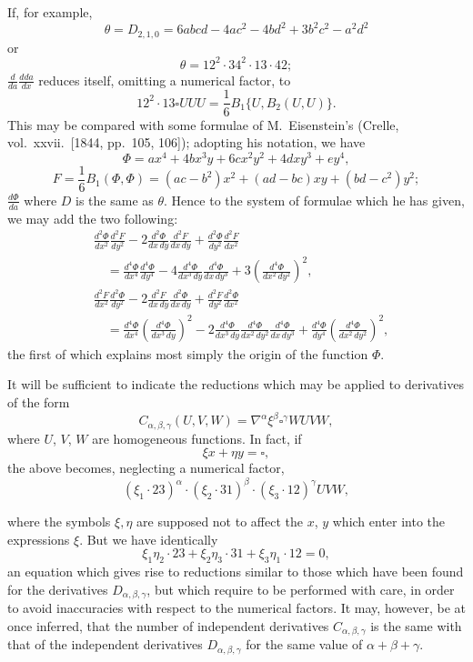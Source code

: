 \documentclass[12pt,a4paper]{article}
\begin{document}
\newpage
\setcounter{page}{111}

If, for example,
\[
\theta = D_{2,1,0} = 6abcd - 4ac^2 - 4bd^2 + 3b^2c^2 - a^2d^2
\]
or
\[
\theta = 12^2 \cdot 34^2 \cdot 13 \cdot 42;
\]
$\frac{d}{da} \frac{dda}{dx}$ reduces itself, omitting a numerical factor, to
\[
12^2 \cdot 13 \square UUU = \frac{1}{6} B_1\{U, B_2(U, U)\}.
\]
This may be compared with some formulae of M.~Eisenstein's (Crelle, vol.~xxvii.\ [1844, pp.~105, 106]); adopting his notation, we have
\[
\Phi = ax^4 + 4bx^3y + 6cx^2y^2 + 4dxy^3 + ey^4,
\]
\[
F = \frac{1}{6} B_1(\Phi, \Phi) = (ac-b^2)x^2 + (ad-bc)xy + (bd-c^2)y^2;
\]
$\frac{d\Phi}{da}$ where $D$ is the same as $\theta$. Hence to the system of formulae which he has given,
we may add the two following:
\begin{align*}
&\frac{d^2\Phi}{dx^2} \frac{d^2F}{dy^2} - 2 \frac{d^2\Phi}{dx\,dy} \frac{d^2F}{dx\,dy} + \frac{d^2\Phi}{dy^2} \frac{d^2F}{dx^2}\\
&\quad = \frac{d^4\Phi}{dx^4} \frac{d^4\Phi}{dy^4} - 4 \frac{d^4\Phi}{dx^3\,dy} \frac{d^4\Phi}{dx\,dy^3}
+ 3 \left(\frac{d^4\Phi}{dx^2\,dy^2}\right)^2,\\
&\frac{d^2F}{dx^2} \frac{d^2\Phi}{dy^2} - 2 \frac{d^2F}{dx\,dy} \frac{d^2\Phi}{dx\,dy} + \frac{d^2F}{dy^2} \frac{d^2\Phi}{dx^2}\\
&\quad = \frac{d^4\Phi}{dx^4} \left(\frac{d^4\Phi}{dx^3\,dy}\right)^2
- 2 \frac{d^4\Phi}{dx^3\,dy} \frac{d^4\Phi}{dx^2\,dy^2} \frac{d^4\Phi}{dx\,dy^3}
+ \frac{d^4\Phi}{dy^4} \left(\frac{d^4\Phi}{dx^2\,dy^2}\right)^2,
\end{align*}
the first of which explains most simply the origin of the function $\Phi$.

It will be sufficient to indicate the reductions which may be applied to derivatives
of the form
\[
C_{\alpha,\beta,\gamma}(U, V, W) = \nabla^\alpha \xi^\beta \square^\gamma WUVW,
\]
where $U$, $V$, $W$ are homogeneous functions. In fact, if
\[
\xi x + \eta y = \square,
\]
the above becomes, neglecting a numerical factor,
\[
(\xi_1 \cdot 23)^\alpha \cdot (\xi_2 \cdot 31)^\beta \cdot (\xi_3 \cdot 12)^\gamma UVW,
\]

\newpage
\setcounter{page}{112}

where the symbols $\xi, \eta$ are supposed not to affect the $x$, $y$ which enter into the
expressions $\xi$. But we have identically
\[
\xi_1 \eta_2 \cdot 23 + \xi_2 \eta_3 \cdot 31 + \xi_3 \eta_1 \cdot 12 = 0,
\]
an equation which gives rise to reductions similar to those which have been found for
the derivatives $D_{\alpha,\beta,\gamma}$, but which require to be performed with care, in order to avoid
inaccuracies with respect to the numerical factors. It may, however, be at once
inferred, that the number of independent derivatives $C_{\alpha,\beta,\gamma}$ is the same with that of
the independent derivatives $D_{\alpha,\beta,\gamma}$ for the same value of $\alpha + \beta + \gamma$.
\end{document}
